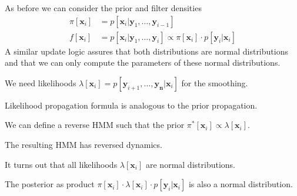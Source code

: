 \documentclass[landscape,footrule]{foils}
\renewcommand{\vec}[1]{\boldsymbol{#1}}
\begin{document}


As before we can consider the prior and filter densities
\begin{align*}
\pi[\vec{x}_i]&=p[\vec{x}_i|\vec{y}_1,\ldots, \vec{y}_{i-1}]\\
f[\vec{x}_i]&=p[\vec{x}_i|\vec{y}_1,\ldots, \vec{y}_{i}]\propto \pi[\vec{x}_i]\cdot p[\vec{y}_i|\vec{x}_i]
\end{align*}
A similar update logic assures that both distributions are normal distributions and that we can only compute the parameters of these normal distributions. 
 


\begin{triangles}
\item We need likelihoods $\lambda[\vec{x}_i]=p[\vec{y}_{i+1},\ldots, \vec{y_n}|\vec{x}_i]$ for the smoothing.
\item Likelihood propagation formula is analogous to the prior propagation.
\item We can define a reverse HMM such that the prior $\pi^*[\vec{x}_i]\propto \lambda[\vec{x}_i]$.
\item The resulting HMM has reversed dynamics. 
\item It turns out that all likelihoods $\lambda[\vec{x}_i]$ are normal distributions.
\item The posterior as product $\pi[\vec{x}_i]\cdot \lambda[\vec{x}_i]\cdot p[\vec{y}_i|\vec{x}_i]$ is also a normal distribution.
\end{triangles}






\end{document}
